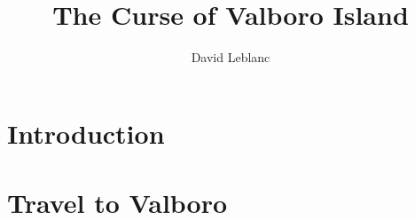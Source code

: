 \documentclass{article}
\title{The Curse of Valboro Island}
\author{David Leblanc}
\date{ }
\begin{document}
	
	\maketitle
	
	\section{Introduction}
	
	
	
	\section{Travel to Valboro}
	
	
	
\end{document}
